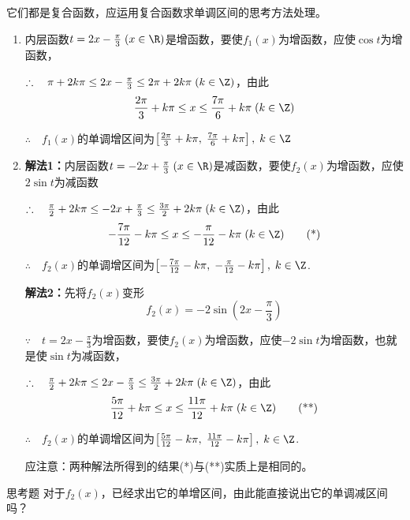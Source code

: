 \begin{analyze}
它们都是复合函数，应运用复合函数求单调区间的思考方法处理。
\end{analyze}

\begin{solution}
\begin{enumerate}[(1)]
    \item 内层函数$t=2x-\frac{\pi}{3}\; (x\in\R)$是增函数，要使$f_1(x)$为增函数，应使$\cos t$为增函数，

$\therefore\quad \pi+2k\pi\le 2x-\frac{\pi}{3}\le 2\pi+2k\pi\; (k\in\Z)$，由此
\[\frac{2\pi}{3}+ k\pi\le x \le \frac{7\pi}{6}+k\pi\; (k\in\Z)\]

$\therefore\quad f_1(x)$的单调增区间为$\left[\frac{2\pi}{3}+k\pi,\; \frac{7\pi}{6}+k\pi\right],\; k\in\Z$

\item \textbf{解法1：}内层函数$t=-2x+\frac{\pi}{3}\; (x\in\R)$是减函数，要使$f_2(x)$为增函数，应使$2\sin t$为减函数

$\therefore\quad \frac{\pi}{2}+2k\pi\le -2x+\frac{\pi}{3}\le \frac{3\pi}{2}+2k\pi\; (k\in\Z)$，由此
\begin{equation}
    -\frac{7\pi}{12}-k\pi\le x \le -\frac{\pi}{12}-k\pi\; (k\in\Z)  \tag{*}
\end{equation}

$\therefore\quad f_2(x)$的单调增区间为$\left[-\frac{7\pi}{12}-k\pi,\; -\frac{\pi}{12}-k\pi\right],\; k\in\Z$.

\textbf{解法2：}先将$f_2(x)$变形
\[f_2(x)=-2\sin\left(2x-\frac{\pi}{3}\right)\]

$\because\quad t=2x-\frac{\pi}{3}$为增函数，要使$f_2(x)$为增函数，应使$-2\sin t$为增函数，也就是使$\sin t$为减函数，

$\therefore\quad \frac{\pi}{2}+2k\pi\le 2x-\frac{\pi}{3}\le \frac{3\pi}{2}+2k\pi\; (k\in\Z)$，由此
\begin{equation}
    \frac{5\pi}{12}+k\pi\le x\le \frac{11\pi}{12}+k\pi\; (k\in\Z)\tag{**}
\end{equation}

$\therefore\quad f_2(x)$的单调增区间为$\left[\frac{5\pi}{12}-k\pi,\; \frac{11\pi}{12}-k\pi\right],\; k\in\Z$.

应注意：两种解法所得到的结果(*)与(**)实质上是相同的。
\end{enumerate}    
\end{solution}

\begin{thm}
    {思考题} 对于$f_2(x)$，已经求出它的单增区间，由此能直接说出它的单调减区间吗？
\end{thm}

